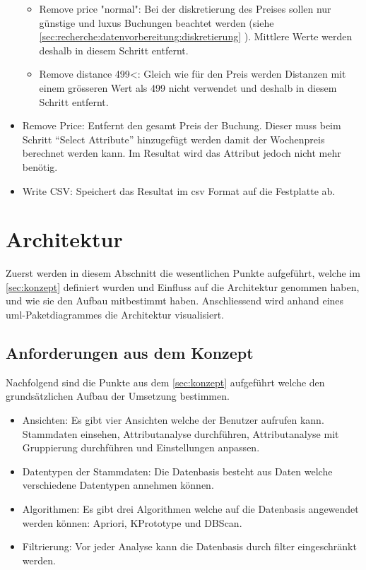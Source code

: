 \begin{itemize}
\begin{itemize}
			\item Remove price "normal": Bei der diskretierung des Preises sollen nur günstige und luxus Buchungen beachtet werden (siehe \cref{sec:recherche:datenvorbereitung:diskretierung} ). Mittlere Werte werden deshalb in diesem Schritt entfernt.
			\item Remove distance 499<: Gleich wie für den Preis werden Distanzen mit einem grösseren Wert als 499 nicht verwendet und deshalb in diesem Schritt entfernt.
 		\end{itemize}
 	\item Remove Price: Entfernt den gesamt Preis der Buchung. Dieser muss beim Schritt "`Select Attribute"' hinzugefügt werden damit der Wochenpreis berechnet werden kann. Im Resultat wird das Attribut jedoch nicht mehr benötig.
 	\item Write CSV: Speichert das Resultat im \gls{csv} Format auf die Festplatte ab.
 \end{itemize}

\section{Architektur}
\label{sec:proofofconcept:architektur}
Zuerst werden in diesem Abschnitt die wesentlichen Punkte aufgeführt, welche im \cref{sec:konzept} definiert wurden und Einfluss auf die Architektur genommen haben, und wie sie den Aufbau mitbestimmt haben. 
Anschliessend wird anhand eines \gls{uml}-Paketdiagrammes die Architektur visualisiert.

\subsection{Anforderungen aus dem Konzept}
\label{sec:proofofconcept:architektur:anforderungen}
Nachfolgend sind die Punkte aus dem \cref{sec:konzept} aufgeführt welche den grundsätzlichen Aufbau der Umsetzung bestimmen.

\begin{itemize}
	\item Ansichten: Es gibt vier Ansichten welche der Benutzer aufrufen kann.  Stammdaten einsehen, Attributanalyse durchführen, Attributanalyse mit Gruppierung durchführen und Einstellungen anpassen.
	\item Datentypen der Stammdaten: Die Datenbasis besteht aus Daten welche verschiedene Datentypen annehmen können.
	\item Algorithmen: Es gibt drei Algorithmen welche auf die Datenbasis angewendet werden können: Apriori, KPrototype und DBScan.
	\item Filtrierung: Vor jeder Analyse kann die Datenbasis durch filter eingeschränkt werden.
\end{itemize}

